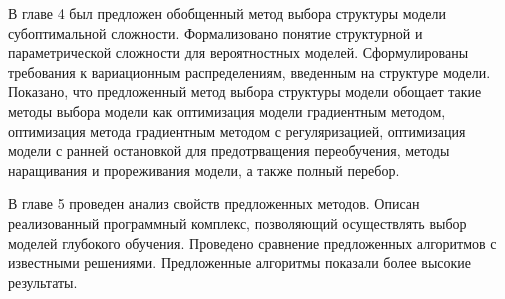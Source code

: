 В главе 4 был предложен обобщенный метод выбора структуры модели субоптимальной сложности. Формализовано понятие структурной и параметрической сложности для вероятностных моделей. Сформулированы требования к вариационным распределениям, введенным на структуре модели. Показано, что предложенный метод выбора структуры модели обощает такие методы выбора модели как оптимизация модели градиентным методом, оптимизация метода градиентным методом с регуляризацией, оптимизация модели с ранней остановкой для предотрващения переобучения, методы наращивания и прореживания модели, а также полный перебор.

В главе 5 проведен анализ свойств предложенных методов. Описан реализованный программный комплекс, позволяющий осуществлять выбор моделей глубокого обучения. Проведено сравнение предложенных алгоритмов с известными решениями. Предложенные алгоритмы показали более высокие результаты. 

